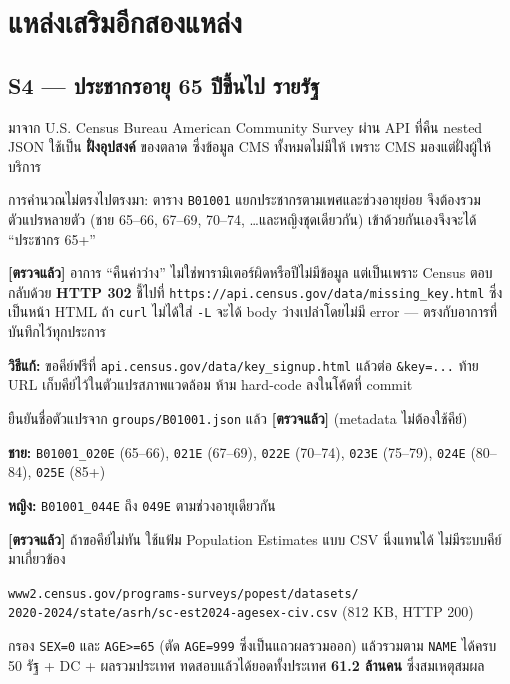\documentclass[11pt,a4paper]{article}
\newcommand{\en}[1]{#1}
\newcommand{\code}[1]{\texttt{#1}}
\newcommand{\ok}{\textcolor{dw}{\textbf{[ตรวจแล้ว]}}}
\begin{document}
\section{แหล่งเสริมอีกสองแหล่ง}

\subsection{S4 --- ประชากรอายุ 65 ปีขึ้นไป รายรัฐ}
มาจาก \en{U.S. Census Bureau} \en{American Community Survey} ผ่าน API ที่คืน
\en{nested JSON} ใช้เป็น \textbf{ฝั่งอุปสงค์} ของตลาด ซึ่งข้อมูล CMS ทั้งหมดไม่มีให้
เพราะ CMS มองแต่ฝั่งผู้ให้บริการ

การคำนวณไม่ตรงไปตรงมา: ตาราง \code{B01001} แยกประชากรตามเพศและช่วงอายุย่อย
จึงต้องรวมตัวแปรหลายตัว (ชาย 65--66, 67--69, 70--74, \dots และหญิงชุดเดียวกัน)
เข้าด้วยกันเองจึงจะได้ ``ประชากร 65+''

\begin{goodbox}[title={หาสาเหตุที่เรียกไม่สำเร็จได้แล้ว --- Census บังคับใช้ API key}]
\ok{} อาการ ``คืนค่าว่าง'' ไม่ใช่พารามิเตอร์ผิดหรือปีไม่มีข้อมูล แต่เป็นเพราะ
Census ตอบกลับด้วย \textbf{HTTP 302} ชี้ไปที่
\code{https://api.census.gov/data/missing_key.html} ซึ่งเป็นหน้า HTML
ถ้า \code{curl} ไม่ได้ใส่ \code{-L} จะได้ body ว่างเปล่าโดยไม่มี error
--- ตรงกับอาการที่บันทึกไว้ทุกประการ

\vspace{0.3em}
\textbf{วิธีแก้:} ขอคีย์ฟรีที่ \code{api.census.gov/data/key_signup.html}
แล้วต่อ \code{\&key=...} ท้าย URL เก็บคีย์ไว้ในตัวแปรสภาพแวดล้อม
ห้าม hard-code ลงในโค้ดที่ commit
\end{goodbox}

\begin{keybox}[title={ตัวแปร 12 ตัวที่ต้องบวกกันเพื่อให้ได้ ``ประชากร 65+''}]
ยืนยันชื่อตัวแปรจาก \code{groups/B01001.json} แล้ว \ok{} (metadata ไม่ต้องใช้คีย์)

\vspace{0.3em}
\textbf{ชาย:} \code{B01001_020E} (65--66), \code{021E} (67--69),
\code{022E} (70--74), \code{023E} (75--79), \code{024E} (80--84),
\code{025E} (85+)

\vspace{0.3em}
\textbf{หญิง:} \code{B01001_044E} ถึง \code{049E} ตามช่วงอายุเดียวกัน
\end{keybox}

\begin{goodbox}[title={ทางถอยที่ทดสอบแล้วว่าใช้ได้ และไม่ต้องใช้คีย์เลย}]
\ok{} ถ้าขอคีย์ไม่ทัน ใช้แฟ้ม \en{Population Estimates} แบบ CSV นิ่งแทนได้
ไม่มีระบบคีย์มาเกี่ยวข้อง

\vspace{0.3em}
\code{www2.census.gov/programs-surveys/popest/datasets/} \\
\code{2020-2024/state/asrh/sc-est2024-agesex-civ.csv} (812 KB, HTTP 200)

\vspace{0.3em}
กรอง \code{SEX=0} และ \code{AGE>=65} (ตัด \code{AGE=999} ซึ่งเป็นแถวผลรวมออก)
แล้วรวมตาม \code{NAME} ได้ครบ 50 รัฐ + DC + ผลรวมประเทศ
ทดสอบแล้วได้ยอดทั้งประเทศ \textbf{61.2 ล้านคน} ซึ่งสมเหตุสมผล
\end{goodbox}
\end{document}

